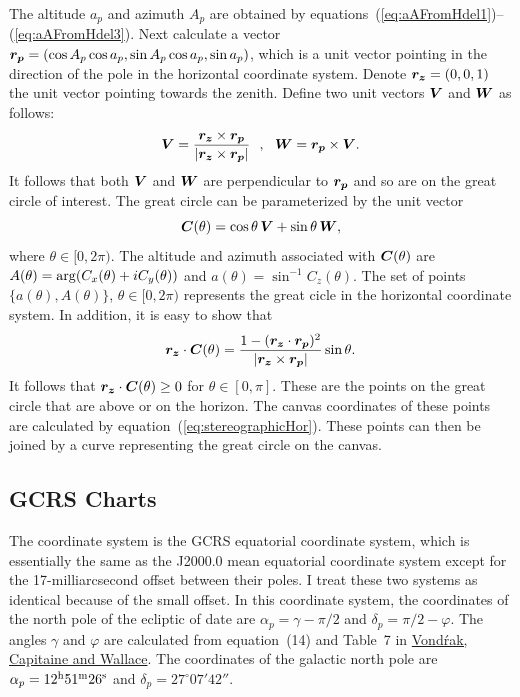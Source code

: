 \documentclass[12pt]{article}
\newcommand \beq {\begin{equation}}
\newcommand \eeq {\end{equation}}
\newcommand{\ve}[1]{\mbox{\boldmath $#1$}}
\begin{document}
The altitude $a_p$ and azimuth $A_p$ are obtained by 
equations~(\ref{eq:aAFromHdel1})--(\ref{eq:aAFromHdel3}). Next calculate a vector 
$\ve{r_p} = (\cos A_p \cos a_p, \sin A_p \cos a_p, \sin a_p)$, which is a unit 
vector pointing in the direction of the pole in the horizontal coordinate system.
Denote $\ve{r_z}=(0,0,1)$ the unit vector pointing towards the zenith. Define two 
unit vectors $\ve{V}$ and $\ve{W}$ as follows:
\beq
  \ve{V} = \frac{\ve{r_z}\times \ve{r_p}}{|\ve{r_z}\times \ve{r_p}|} \ \ , \ \ 
  \ve{W} = \ve{r_p} \times \ve{V} .
\eeq
It follows that both $\ve{V}$ and $\ve{W}$ are perpendicular to $\ve{r_p}$ and so 
are on the great circle of interest. The great circle can be parameterized by 
the unit vector
\beq
  \ve{C}(\theta) = \cos \theta \, \ve{V} + \sin \theta \, \ve{W} ,
\eeq
where $\theta \in [0,2\pi)$. The altitude and azimuth associated with 
$\ve{C}(\theta)$ are $A(\theta)={\rm arg}(C_x(\theta) + i C_y(\theta))$ and 
$a(\theta) = \sin^{-1} C_z(\theta)$. The set of points $\{ a(\theta), A(\theta) \}$, 
$\theta \in [0,2\pi)$ represents the great cicle in the horizontal coordinate 
system. In addition, it is easy to show that 
\beq
  \ve{r_z} \cdot \ve{C}(\theta) = \frac{1-(\ve{r_z}\cdot \ve{r_p})^2}
{|\ve{r_z}\times \ve{r_p}|} 
\sin \theta .
\eeq
It follows that $\ve{r_z} \cdot \ve{C}(\theta) \geq 0$ for $\theta \in [0,\pi]$. 
These are the points on the great circle that are above or on the horizon. 
The canvas coordinates of these points are calculated by 
equation~(\ref{eq:stereographicHor}). These points can then be joined by a 
curve representing the great circle on the canvas.

\subsection{GCRS Charts} 

The coordinate system is the GCRS equatorial coordinate system, which is essentially 
the same as the J2000.0 mean equatorial coordinate system except for the 
17-milliarcsecond offset between their poles. I treat these two systems 
as identical because of the small offset. In this coordinate system, the 
coordinates of the north pole of the ecliptic of date are $\alpha_p = \gamma-\pi/2$ 
and $\delta_p = \pi/2 - \varphi$. The angles $\gamma$ and $\varphi$ are 
calculated from equation~(14) and Table~7 in
\href{http://adsabs.harvard.edu/abs/2011A%26A...534A..22V}{Vond\'rak,
Capitaine and Wallace}. The coordinates of the galactic north pole are 
$\alpha_{p} = 12^{\rm h} 51^{\rm m} 26^{\rm s}$ and $\delta_{p} = 27^\circ 07' 42''$. 
\end{document}
